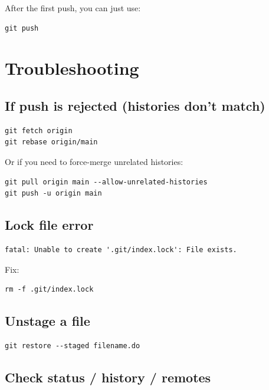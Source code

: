 \documentclass[11pt]{article}
\begin{document}
After the first push, you can just use:

\begin{lstlisting}[style=bash]
git push
\end{lstlisting}

\section{Troubleshooting}

\subsection{If push is rejected (histories don't match)}

\begin{lstlisting}[style=bash]
git fetch origin
git rebase origin/main
\end{lstlisting}

Or if you need to force-merge unrelated histories:

\begin{lstlisting}[style=bash]
git pull origin main --allow-unrelated-histories
git push -u origin main
\end{lstlisting}

\subsection{Lock file error}

\begin{lstlisting}[style=bash]
fatal: Unable to create '.git/index.lock': File exists.
\end{lstlisting}

Fix:

\begin{lstlisting}[style=bash]
rm -f .git/index.lock
\end{lstlisting}

\subsection{Unstage a file}

\begin{lstlisting}[style=bash]
git restore --staged filename.do
\end{lstlisting}

\subsection{Check status / history / remotes}
\end{document}
